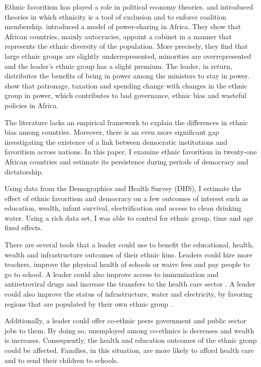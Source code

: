 \documentclass{wptemp}
\begin{document}
Ethnic favoritism has played a role in political economy theories. \citet{fearon1999ethnic} and \citet{caselli2006theory} introduced theories in which ethnicity is a tool of exclusion and to enforce coalition membership. \citet{francois2015power} introduced a model of power-sharing in Africa. They show that African countries, mainly autocracies, appoint a cabinet in a manner that represents the ethnic diversity of the population. More precisely, they find that large ethnic groups are slightly underrepresented, minorities are overrepresented and the leader's ethnic group has a slight premium. The leader, in return, distributes the benefits of being in power among the ministers to stay in power. \citet{padro2007control} show that patronage, taxation and spending change with changes in the ethnic group in power, which contributes to bad governance, ethnic bias and wasteful policies in Africa.


The literature lacks an empirical framework to explain the differences in ethnic bias among countries. Moreover, there is an even more significant gap investigating the existence of a link between democratic institutions and favoritism across nations. In this paper, I examine ethnic favoritism in twenty-one African countries and estimate its persistence during periods of democracy and dictatorship. 

Using data from the Demographics and Health Survey (DHS), I estimate the effect of ethnic favoritism and democracy on a few outcomes of interest such as education, wealth, infant survival, electrification and access to clean drinking water. Using a rich data set, I was able to control for ethnic group, time and age fixed effects. 

There are several tools that a leader could use to benefit the educational, health, wealth and infrastructure outcomes of their ethnic kins. Leaders could hire more teachers, improve the physical health of schools \citep{glewwe2006schools} or waive fees and pay people to go to school. A leader could also improve access to immunization and antiretroviral drugs and increase the transfers to the health care sector \citep{friedman2018corruption, jones2003many}. A leader could also improve the status of infrastructure, water and electricity, by favoring regions that are populated by their own ethnic group \citep{hodler2014regional}.

Additionally, a leader could offer co-ethnic peers government and public sector jobs to them. By doing so, unemployed among co-ethnics is decreases and wealth is increases. Consequently, the health and education outcomes of the ethnic group could be affected. Families, in this situation, are more likely to afford health care and to send their children to schools. 
\end{document}
